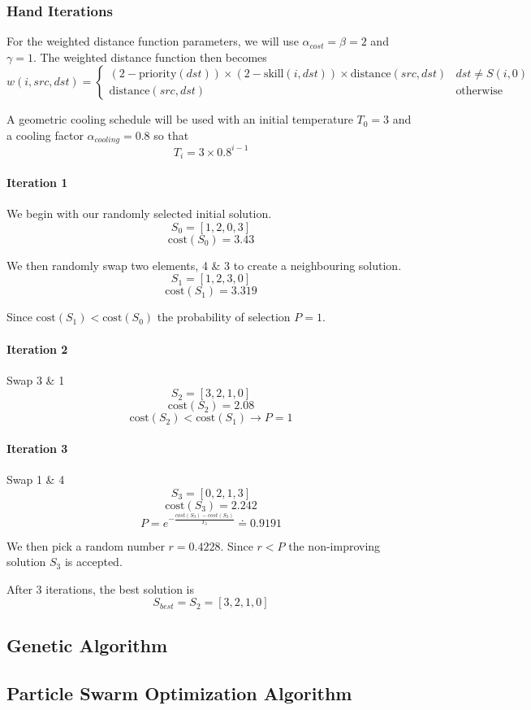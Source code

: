 \documentclass[a4paper]{article}
\newcommand{\subsubsubsection}[1]{\paragraph{#1} \mbox{}}
\begin{document}
\subsubsection{Hand Iterations}

For the weighted distance function parameters, we will use $\alpha_{cost} = \beta = 2$ and $\gamma = 1$. The weighted distance function then becomes
$$
w(i, \mathit{src}, \mathit{dst}) = \begin{cases}
(2 - \text{priority}(\mathit{dst})) \times (2 - \text{skill}(i, \mathit{dst})) \times \text{distance}(\mathit{src}, \mathit{dst}) & \mathit{dst} \ne S(i,0) \\
\text{distance}(\mathit{src}, \mathit{dst}) & \text{otherwise}
\end{cases}
$$

A geometric cooling schedule will be used with an initial temperature $T_{0} = 3$ and a cooling factor $\alpha_{cooling} = 0.8$ so that
$$T_{i} = 3 \times 0.8^{i-1}$$

\subsubsubsection{Iteration 1}

We begin with our randomly selected initial solution.
$$S_0 = [ 1, 2, 0, 3 ]$$
$$\text{cost}(S_0) = 3.43$$

We then randomly swap two elements, 4 \& 3 to create a neighbouring solution.
$$S_1 = [ 1, 2, 3, 0 ]$$
$$\text{cost}(S_1) = 3.319$$

Since $\text{cost}(S_1) < \text{cost}(S_0)$ the probability of selection $P = 1$.

\subsubsubsection{Iteration 2}

Swap 3 \& 1
$$S_2 = [ 3, 2, 1, 0 ]$$
$$\text{cost}(S_2) = 2.08$$
$$\text{cost}(S_2) < \text{cost}(S_1) \rightarrow P = 1$$

\subsubsubsection{Iteration 3}

Swap 1 \& 4
$$S_3 = [ 0, 2, 1, 3 ]$$
$$\text{cost}(S_3) = 2.242$$
$$P = e^{-\frac{cost(S_3) - cost(S_2)}{T_3}} \doteq 0.9191$$

We then pick a random number $r = 0.4228$. Since $r < P$ the non-improving solution $S_3$ is accepted.

After 3 iterations, the best solution is
$$S_{best} = S_2 = [ 3, 2, 1, 0 ]$$

\subsection{Genetic Algorithm} %

\subsection{Particle Swarm Optimization Algorithm} %
\end{document}
